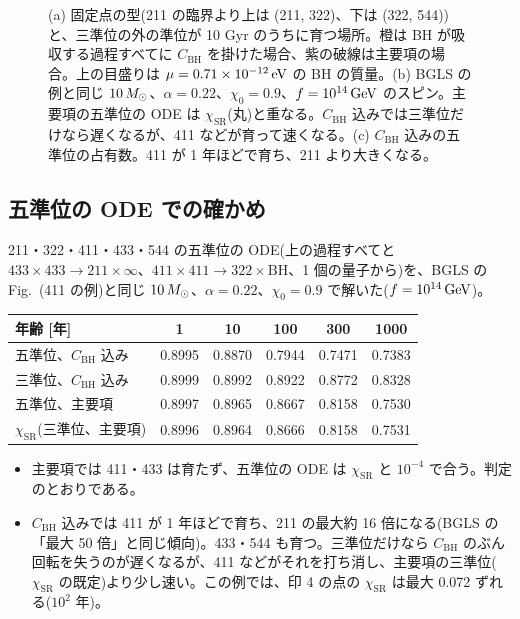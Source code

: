 \begin{figure}[H]
\centering

\caption{(a) 固定点の型(211 の臨界より上は (211, 322)、下は (322, 544))と、三準位の外の準位が 10 Gyr のうちに育つ場所。橙は BH が吸収する過程すべてに $C_\mathrm{BH}$ を掛けた場合、紫の破線は主要項の場合。上の目盛りは $\mu=0.71\times10^{-12}\,\mathrm{eV}$ の BH の質量。(b) BGLS の例と同じ $10\,M_\odot$、$\alpha=0.22$、$\chi_0=0.9$、$f=10^{14}\,\mathrm{GeV}$ のスピン。主要項の五準位の ODE は $\chi_\mathrm{SR}$(丸)と重なる。$C_\mathrm{BH}$ 込みでは三準位だけなら遅くなるが、411 などが育って速くなる。(c) $C_\mathrm{BH}$ 込みの五準位の占有数。411 が 1 年ほどで育ち、211 より大きくなる。}
\label{fig:e15}
\end{figure}

\subsection{五準位の ODE での確かめ}

211・322・411・433・544 の五準位の ODE(上の過程すべてと $433\times433\to211\times\infty$、$411\times411\to322\times\mathrm{BH}$、1 個の量子から)を、BGLS の Fig.~(411 の例)と同じ $10\,M_\odot$、$\alpha=0.22$、$\chi_0=0.9$ で解いた($f=10^{14}\,\mathrm{GeV}$)。

\begin{center}\small
\begin{tabular}{lccccc}
\toprule
年齢 [年] & 1 & 10 & 100 & 300 & 1000\\
\midrule
五準位、$C_\mathrm{BH}$ 込み & 0.8995 & 0.8870 & 0.7944 & 0.7471 & 0.7383\\
三準位、$C_\mathrm{BH}$ 込み & 0.8999 & 0.8992 & 0.8922 & 0.8772 & 0.8328\\
五準位、主要項 & 0.8997 & 0.8965 & 0.8667 & 0.8158 & 0.7530\\
$\chi_\mathrm{SR}$(三準位、主要項) & 0.8996 & 0.8964 & 0.8666 & 0.8158 & 0.7531\\
\bottomrule
\end{tabular}
\end{center}

\begin{result}
\begin{itemize}
\item 主要項では 411・433 は育たず、五準位の ODE は $\chi_\mathrm{SR}$ と $10^{-4}$ で合う。判定のとおりである。
\item $C_\mathrm{BH}$ 込みでは 411 が 1 年ほどで育ち、211 の最大約 16 倍になる(BGLS の「最大 50 倍」と同じ傾向)。433・544 も育つ。三準位だけなら $C_\mathrm{BH}$ のぶん回転を失うのが遅くなるが、411 などがそれを打ち消し、主要項の三準位($\chi_\mathrm{SR}$ の既定)より少し速い。この例では、印 4 の点の $\chi_\mathrm{SR}$ は最大 0.072 ずれる($10^2$ 年)。
\end{itemize}
\end{result}

